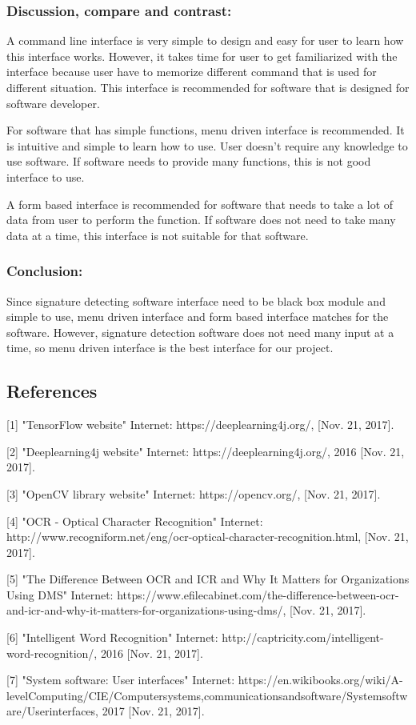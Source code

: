 \documentclass[article, onecolumn, draftclsnofoot,10pt, compsoc]{IEEEtran}
\begin{document}
\subsubsection{Discussion, compare and contrast:}
A command line interface is very simple to design and easy for user to learn how this interface works. However, it takes time for user to get familiarized with the interface because user have to memorize different command that is used for different situation. This interface is recommended for software that is designed for software developer. 

For software that has simple functions, menu driven interface is recommended. It is intuitive and simple to learn how to use. User doesn\rq t require any knowledge to use software. If software needs to provide many functions, this is not good interface to use.

A form based interface is recommended for software that needs to take a lot of data from user to perform the function. If software does not need to take many data at a time, this interface is not suitable for that software.


\subsubsection{Conclusion:}
Since signature detecting software interface need to be black box module and simple to use, menu driven interface and form based interface matches for the software. However, signature detection software does not need many input at a time, so menu driven interface is the best interface for our project.

\subsection{References}
[1] "TensorFlow website" Internet: https://deeplearning4j.org/, [Nov. 21, 2017].

[2] "Deeplearning4j website" Internet: https://deeplearning4j.org/, 2016 [Nov. 21, 2017]. 

[3] "OpenCV library website" Internet: https://opencv.org/, [Nov. 21, 2017].

[4] "OCR - Optical Character Recognition" Internet: http://www.recogniform.net/eng/ocr-optical-character-recognition.html, [Nov. 21, 2017].

[5] "The Difference Between OCR and ICR and Why It Matters for Organizations Using DMS" Internet: https://www.efilecabinet.com/the-difference-between-ocr-and-icr-and-why-it-matters-for-organizations-using-dms/, [Nov. 21, 2017].

[6] "Intelligent Word Recognition" Internet: http://captricity.com/intelligent-word-recognition/, 2016 [Nov. 21, 2017].

[7] "System software: User interfaces" Internet: https://en.wikibooks.org/wiki/A-levelComputing/CIE/Computersystems,communicationsandsoftware/Systemsoftware/Userinterfaces, 2017 [Nov. 21, 2017].
\end{document}
